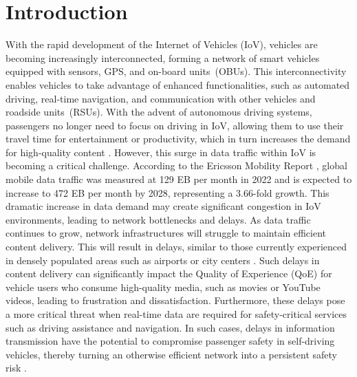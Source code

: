 \documentclass{aims}
\numberwithin{equation}{section}
\begin{document}

\maketitle

\section{Introduction}
With the rapid development of the Internet of Vehicles (IoV), vehicles are becoming increasingly interconnected, forming a network of smart vehicles equipped with sensors, GPS, and on-board units~(OBUs). This interconnectivity enables vehicles to take advantage of enhanced functionalities, such as automated driving, real-time navigation, and communication with other vehicles and roadside units~(RSUs). With the advent of autonomous driving systems, passengers no longer need to focus on driving in IoV, allowing them to use their travel time for entertainment or productivity, which in turn increases the demand for high-quality content \cite{yuan2018}. However, this surge in data traffic within IoV is becoming a critical challenge. According to the Ericsson Mobility Report \cite{Ericsson}, global mobile data traffic was measured at 129 EB per month in 2022 and is expected to increase to 472 EB per month by 2028, representing a 3.66-fold growth. This dramatic increase in data demand may create significant congestion in IoV environments, leading to network bottlenecks and delays. As data traffic continues to grow, network infrastructures will struggle to maintain efficient content delivery. This will result in delays, similar to those currently experienced in densely populated areas such as airports or city centers \cite{Pranav2019}. Such delays in content delivery can significantly impact the Quality of Experience (QoE) for vehicle users who consume high-quality media, such as movies or YouTube videos, leading to frustration and dissatisfaction. Furthermore, these delays pose a more critical threat when real-time data are required for safety-critical services such as driving assistance and navigation. In such cases, delays in information transmission have the potential to compromise passenger safety in self-driving vehicles, thereby turning an otherwise efficient network into a persistent safety risk \cite{Reichardt2002}.
\end{document}
